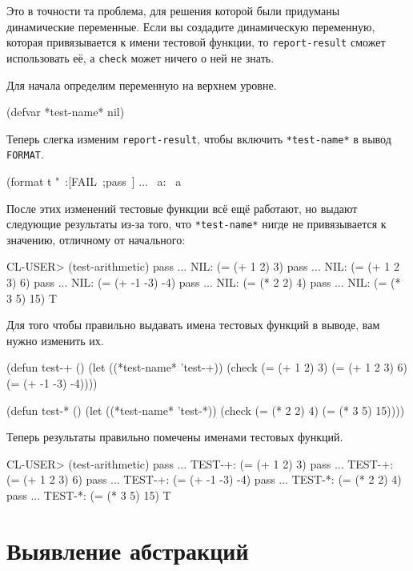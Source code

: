 Это в точности та проблема, для решения которой были придуманы динамические
переменные. Если вы создадите динамическую переменную, которая привязывается к имени
тестовой функции, то \lstinline{report-result} сможет использовать её, а \lstinline{check} может
ничего о ней не знать.

Для начала определим переменную на верхнем уровне.

\begin{myverb}
(defvar *test-name* nil)
\end{myverb}

Теперь слегка изменим \lstinline{report-result}, чтобы включить \lstinline{*test-name*} в вывод
\lstinline{FORMAT}.

\begin{myverb}
(format t "~:[FAIL~;pass~] ... ~a: ~a~%
\end{myverb}

После этих изменений тестовые функции всё ещё работают, но выдают следующие результаты
из-за того, что \lstinline{*test-name*} нигде не привязывается к значению, отличному от
начального:

\begin{myverb}
CL-USER> (test-arithmetic)
pass ... NIL: (= (+ 1 2) 3)
pass ... NIL: (= (+ 1 2 3) 6)
pass ... NIL: (= (+ -1 -3) -4)
pass ... NIL: (= (* 2 2) 4)
pass ... NIL: (= (* 3 5) 15)
T
\end{myverb}

Для того чтобы правильно выдавать имена тестовых функций в выводе, вам нужно изменить их.

\begin{myverb}
(defun test-+ ()
  (let ((*test-name* 'test-+))
    (check
      (= (+ 1 2) 3)
      (= (+ 1 2 3) 6)
      (= (+ -1 -3) -4))))

(defun test-* ()
  (let ((*test-name* 'test-*))
    (check
      (= (* 2 2) 4)
      (= (* 3 5) 15))))
\end{myverb}

Теперь результаты правильно помечены именами тестовых функций.

\begin{myverb}
CL-USER> (test-arithmetic)
pass ... TEST-+: (= (+ 1 2) 3)
pass ... TEST-+: (= (+ 1 2 3) 6)
pass ... TEST-+: (= (+ -1 -3) -4)
pass ... TEST-*: (= (* 2 2) 4)
pass ... TEST-*: (= (* 3 5) 15)
T
\end{myverb}

\section{Выявление абстракций}

